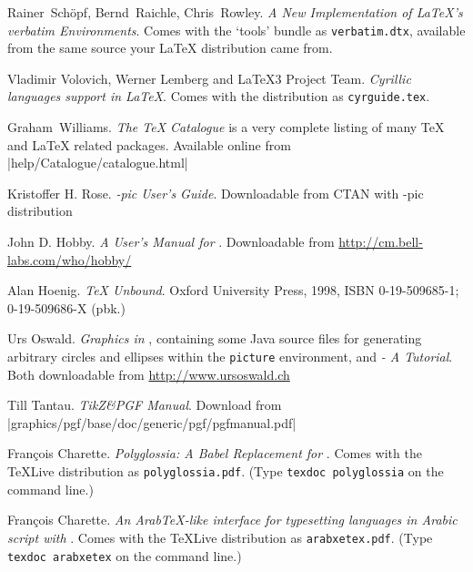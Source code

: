 \begin{thebibliography}{99}
 Rainer~Sch\"opf, Bernd~Raichle, Chris~Rowley.
\newblock \emph{A New Implementation of \LaTeX's verbatim
  Environments}.
 \newblock Comes with the `tools' bundle as
  \texttt{verbatim.dtx}, available from the same source your \LaTeX{}
  distribution came from.

 Vladimir Volovich, Werner Lemberg and \LaTeX3 Project Team.
    \newblock \emph{Cyrillic languages support in \LaTeX}.
    \newblock Comes with the \LaTeXe{} distribution as
  \texttt{cyrguide.tex}.

 Graham~Williams.  \newblock \emph{The TeX
    Catalogue} is a very complete listing of many \TeX{} and \LaTeX{}
    related packages.
  \newblock Available online from \CTAN|help/Catalogue/catalogue.html|

 Kristoffer H. Rose.
  \newblock \emph{\Xy-pic User's Guide}.  \newblock
  Downloadable from CTAN with \Xy-pic distribution

 John D. Hobby.
  \newblock \emph{A User's Manual for \MP}. \newblock
  Downloadable from \url{http://cm.bell-labs.com/who/hobby/}

 Alan Hoenig.
  \newblock \emph{\TeX{} Unbound}. \newblock Oxford University Press, 1998,
    ISBN 0-19-509685-1; 0-19-509686-X (pbk.)

 Urs Oswald.
    \newblock \emph{Graphics in \LaTeXe{}}, containing some Java source files for
    generating arbitrary circles and ellipses within the \texttt{picture} environment,
    and \emph{\MP{} - A Tutorial}.
  \newblock Both downloadable from \url{http://www.ursoswald.ch}

 Till Tantau.
  \newblock \emph{TikZ\&PGF Manual}.\newblock
  Download from \CTAN|graphics/pgf/base/doc/generic/pgf/pgfmanual.pdf|

 Fran\c{c}ois Charette.
    \newblock \emph{Polyglossia: A Babel Replacement for }.
    \newblock Comes with the \TeX Live distribution as
  \texttt{polyglossia.pdf}. (Type \texttt{texdoc polyglossia} on the command line.)

 Fran\c{c}ois Charette.
    \newblock \emph{An Arab\TeX-like interface for typesetting languages
     in Arabic script with }.
    \newblock Comes with the \TeX Live distribution as
  \texttt{arabxetex.pdf}. (Type \texttt{texdoc arabxetex} on the command line.)


\end{thebibliography}

